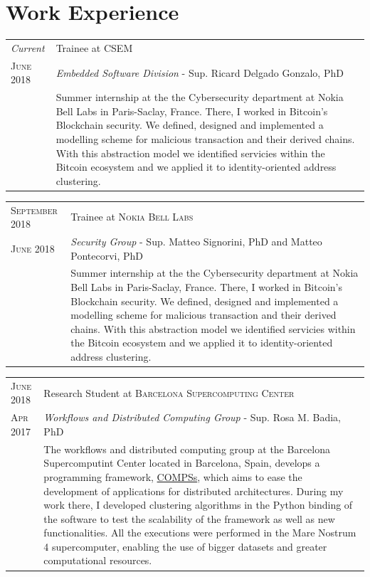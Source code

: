 \documentclass[a4paper,10pt]{article} %
\begin{document}
\section{Work Experience}
%
\begin{tabular}{R{2.5cm}|p{11.5cm}}
    \emph{Current} & Trainee at \textsc{CSEM} \\
    \textsc{June 2018} & \small{\emph{Embedded Software Division} - Sup. Ricard Delgado Gonzalo, PhD }\\ 
& \footnotesize{Summer internship at the the Cybersecurity department at Nokia Bell Labs in Paris-Saclay, France. There, I worked in Bitcoin's Blockchain security. We defined, designed and implemented a modelling scheme for malicious transaction and their derived chains. With this abstraction model we identified servicies within the Bitcoin ecosystem and we applied it to identity-oriented address clustering. }
\end{tabular}

\begin{tabular}{R{3cm}|p{11cm}}
    \textsc{September 2018} & Trainee at \textsc{Nokia Bell Labs} \\
    \textsc{June 2018} & \small{\emph{Security Group} - Sup. Matteo Signorini, PhD and Matteo Pontecorvi, PhD}\\ 
& \footnotesize{Summer internship at the the Cybersecurity department at Nokia Bell Labs in Paris-Saclay, France. There, I worked in Bitcoin's Blockchain security. We defined, designed and implemented a modelling scheme for malicious transaction and their derived chains. With this abstraction model we identified servicies within the Bitcoin ecosystem and we applied it to identity-oriented address clustering. }
\end{tabular}

\begin{tabular}{R{2.5cm}|p{11.5cm}}
\textsc{June 2018} & Research Student at \textsc{Barcelona Supercomputing Center} \\
    \textsc{Apr 2017} & \small{\emph{Workflows and Distributed Computing Group} - Sup. Rosa M. Badia, PhD} \\ 
& \footnotesize{The workflows and distributed computing group at the Barcelona Supercomputint Center located in Barcelona, Spain, develops a programming framework, \href{https://www.bsc.es/research-and-development/software-and-apps/software-list/comp-superscalar/}{COMPSs}, which aims to ease the development of applications for distributed architectures. During my work there, I developed clustering algorithms in the Python binding of the software to test the scalability of the framework as well as new functionalities. All the executions were performed in the Mare Nostrum 4 supercomputer, enabling the use of bigger datasets and greater computational resources.}
\end{tabular}
\end{document}
